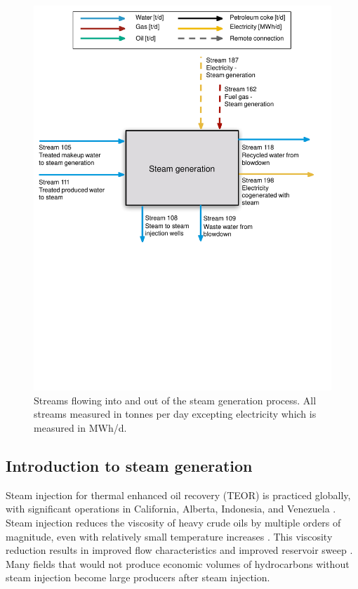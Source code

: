 \documentclass[11pt]{report}
\begin{document}
\begin{figure}
\includegraphics[width=0.85\columnwidth]{images/Steam_generation_PF.pdf}
\caption{Streams flowing into and out of the steam generation process. All streams measured in tonnes per day excepting electricity which is measured in MWh/d.}
\label{fig:steam_generation_PF}
\end{figure}


\subsection{Introduction to steam generation}

Steam injection for thermal enhanced oil recovery (TEOR) is practiced globally, with significant operations in California, Alberta, Indonesia, and Venezuela \cite{Moritis2010}. Steam injection reduces the viscosity of heavy crude oils by multiple orders of magnitude, even with relatively small temperature increases \cite{Baibakov1989, Brandt2010, Donaldson1989, Prats1985, Green1998}. This viscosity reduction results in improved flow characteristics and improved reservoir sweep \cite{Green1998}. Many fields that would not produce economic volumes of hydrocarbons without steam injection become large producers after steam injection.
\end{document}
